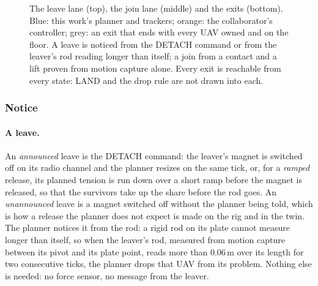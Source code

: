 \begin{figure}[htbp]
\caption[Leave and join lanes and their exits]{The leave lane (top), the join lane (middle) and the exits
(bottom). Blue: this work's planner and trackers; orange: the collaborator's controller; grey: an exit that ends
with every UAV owned and on the floor. A leave is noticed from the DETACH command or from the leaver's rod reading
longer than itself; a join from a contact and a lift proven from motion capture alone. Every exit is reachable
from every state: LAND and the drop rule are not drawn into each.}
\label{fig:reconfig_states}
\end{figure}

\subsubsection{Notice}

\paragraph{A leave.} An \emph{announced} leave is the DETACH command: the leaver's magnet is switched off on its
radio channel and the planner resizes on the same tick, or, for a \emph{ramped} release, its planned tension is run
down over a short ramp before the magnet is released, so that the survivors take up the share before the rod goes.
An \emph{unannounced} leave is a magnet switched off without the planner being told, which is how a release the
planner does not expect is made on the rig and in the twin. The planner notices it from the rod: a rigid rod on its
plate cannot measure longer than itself, so when the leaver's rod, measured from motion capture between its pivot
and its plate point, reads more than 0.06\,m over its length for two consecutive ticks, the planner drops that UAV
from its problem. Nothing else is needed: no force sensor, no message from the leaver.


